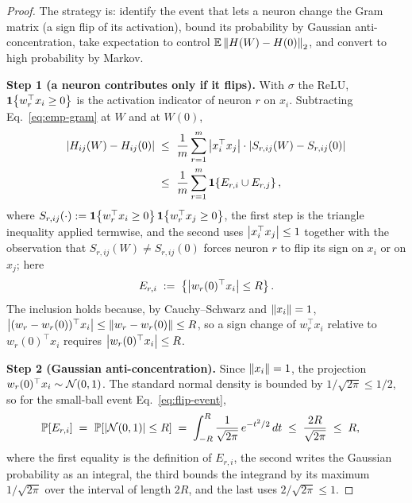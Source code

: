 \begin{proof}
The strategy is: identify the event that lets a neuron change the Gram matrix (a sign flip of
its activation), bound its probability by Gaussian anti-concentration, take expectation to
control $\mathbb{E}\left\| H(W)-H(0) \right\|_{2}$, and convert to high probability by Markov.

\smallskip\noindent\textbf{Step 1 (a neuron contributes only if it flips).}
With $\sigma$ the ReLU, $\mathbf{1}\!\left\{w_r^{\top} x_i \ge 0\right\}$ is the activation indicator of neuron
$r$ on $x_i$. Subtracting Eq.~\eqref{eq:emp-gram} at $W$ and at $W(0)$,
\begin{align}\label{eq:entry-diff}
\left| H_{ij}(W) - H_{ij}(0) \right|
\;\le\; & ~ \frac{1}{m} \sum_{r=1}^{m} \left| x_i^{\top} x_j \right| \cdot
\left|  S_{r,ij}(W) - S_{r,ij}(0)  \right| \\
\;\le\; & ~ \frac{1}{m} \sum_{r=1}^{m} \mathbf{1}\!\left\{ E_{r,i} \cup E_{r,j} \right\},
\end{align}
where $S_{r,ij}(\cdot) := \mathbf{1}\!\left\{w_r^{\top} x_i \ge 0\right\}\mathbf{1}\!\left\{w_r^{\top} x_j \ge 0\right\}$, the first
step is the triangle inequality applied termwise, and the second uses $\left| x_i^{\top}x_j \right|\le1$
together with the observation that $S_{r,ij}(W) \ne S_{r,ij}(0)$ forces neuron $r$ to flip its
sign on $x_i$ or on $x_j$; here
\begin{align}\label{eq:flip-event}
E_{r,i} \;:=\; \left\{ \left|  w_r(0)^{\top} x_i  \right| \le R \right\}.
\end{align}
The inclusion holds because, by Cauchy--Schwarz and $\left\| x_i \right\|=1$,
$\left| (w_r - w_r(0))^{\top} x_i \right| \le \left\| w_r - w_r(0) \right\| \le R$, so a sign change of
$w_r^{\top} x_i$ relative to $w_r(0)^{\top} x_i$ requires $\left| w_r(0)^{\top} x_i \right| \le R$.

\smallskip\noindent\textbf{Step 2 (Gaussian anti-concentration).}
Since $\left\| x_i \right\| = 1$, the projection $w_r(0)^{\top} x_i \sim \mathcal{N}(0, 1)$. The standard normal
density is bounded by $1/\sqrt{2\pi} \le 1/2$, so for the small-ball event Eq.~\eqref{eq:flip-event},
\begin{align}\label{eq:anti-conc}
\mathbb{P}\!\left[ E_{r,i} \right]
\;=\; & ~ \mathbb{P}\!\left[ \left| \mathcal{N}(0,1) \right| \le R \right]
\;=\; \int_{-R}^{R} \frac{1}{\sqrt{2\pi}}\, e^{-t^2/2}\, dt
\;\le\; \frac{2R}{\sqrt{2\pi}}
\;\le\; R,
\end{align}
where the first equality is the definition of $E_{r,i}$, the second writes the Gaussian
probability as an integral, the third bounds the integrand by its maximum $1/\sqrt{2\pi}$ over
the interval of length $2R$, and the last uses $2/\sqrt{2\pi} \le 1$.


\end{proof}
